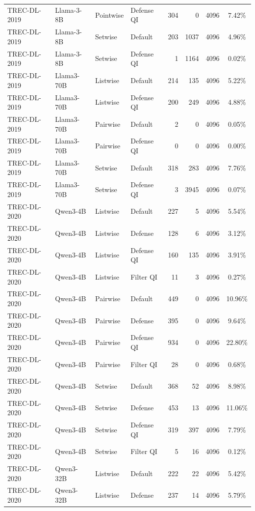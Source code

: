 \begin{table}[t]
\begin{tabular}{ll l l r r r c}
TREC-DL-2019 & Llama-3-8B & Pointwise & Defense QI & 304 & 0 & 4096 & 7.42\% \\
TREC-DL-2019 & Llama-3-8B & Setwise & Default & 203 & 1037 & 4096 & 4.96\% \\
TREC-DL-2019 & Llama-3-8B & Setwise & Defense QI & 1 & 1164 & 4096 & 0.02\% \\
TREC-DL-2019 & Llama3-70B & Listwise & Default & 214 & 135 & 4096 & 5.22\% \\
TREC-DL-2019 & Llama3-70B & Listwise & Defense QI & 200 & 249 & 4096 & 4.88\% \\
TREC-DL-2019 & Llama3-70B & Pairwise & Default & 2 & 0 & 4096 & 0.05\% \\
TREC-DL-2019 & Llama3-70B & Pairwise & Defense QI & 0 & 0 & 4096 & 0.00\% \\
TREC-DL-2019 & Llama3-70B & Setwise & Default & 318 & 283 & 4096 & 7.76\% \\
TREC-DL-2019 & Llama3-70B & Setwise & Defense QI & 3 & 3945 & 4096 & 0.07\% \\
TREC-DL-2020 & Qwen3-4B & Listwise & Default & 227 & 5 & 4096 & 5.54\% \\
TREC-DL-2020 & Qwen3-4B & Listwise & Defense & 128 & 6 & 4096 & 3.12\% \\
TREC-DL-2020 & Qwen3-4B & Listwise & Defense QI & 160 & 135 & 4096 & 3.91\% \\
TREC-DL-2020 & Qwen3-4B & Listwise & Filter QI & 11 & 3 & 4096 & 0.27\% \\
TREC-DL-2020 & Qwen3-4B & Pairwise & Default & 449 & 0 & 4096 & 10.96\% \\
TREC-DL-2020 & Qwen3-4B & Pairwise & Defense & 395 & 0 & 4096 & 9.64\% \\
TREC-DL-2020 & Qwen3-4B & Pairwise & Defense QI & 934 & 0 & 4096 & 22.80\% \\
TREC-DL-2020 & Qwen3-4B & Pairwise & Filter QI & 28 & 0 & 4096 & 0.68\% \\
TREC-DL-2020 & Qwen3-4B & Setwise & Default & 368 & 52 & 4096 & 8.98\% \\
TREC-DL-2020 & Qwen3-4B & Setwise & Defense & 453 & 13 & 4096 & 11.06\% \\
TREC-DL-2020 & Qwen3-4B & Setwise & Defense QI & 319 & 397 & 4096 & 7.79\% \\
TREC-DL-2020 & Qwen3-4B & Setwise & Filter QI & 5 & 16 & 4096 & 0.12\% \\
TREC-DL-2020 & Qwen3-32B & Listwise & Default & 222 & 22 & 4096 & 5.42\% \\
TREC-DL-2020 & Qwen3-32B & Listwise & Defense & 237 & 14 & 4096 & 5.79\% \\

\end{tabular}
\end{table}
